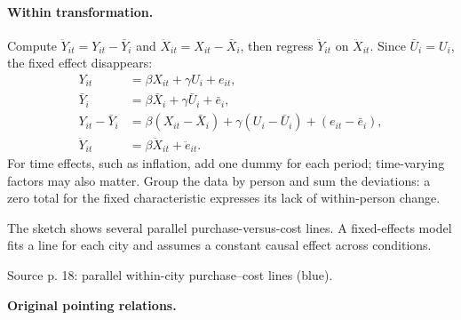 {\paragraph{Within transformation.}
Compute $\ddot Y_{it}=Y_{it}-\bar Y_i$ and $\ddot X_{it}=X_{it}-\bar X_i$, then regress $\ddot Y_{it}$ on $\ddot X_{it}$. Since $\bar U_i=U_i$, the fixed effect disappears:
\begin{align*}
Y_{it}&=\beta X_{it}+\gamma U_i+e_{it},\\
\bar Y_i&=\beta\bar X_i+\gamma\bar U_i+\bar e_i,\\
Y_{it}-\bar Y_i&=\beta(X_{it}-\bar X_i)+\gamma(U_i-\bar U_i)+(e_{it}-\bar e_i),\\
\ddot Y_{it}&=\beta\ddot X_{it}+\ddot e_{it}.
\end{align*}
 For time effects, such as inflation, add one dummy for each period; time-varying factors may also matter. Group the data by person and sum the deviations: a zero total for the fixed characteristic expresses its lack of within-person change.

The sketch shows several parallel purchase-versus-cost lines. A fixed-effects model fits a line for each city and assumes a constant causal effect across conditions.

\begin{center}
\par{\small Source p. 18: parallel within-city purchase--cost lines (blue).}
\end{center}
\par{}\smallskip\textbf{Original pointing relations.}\par\smallskip
{}
}
